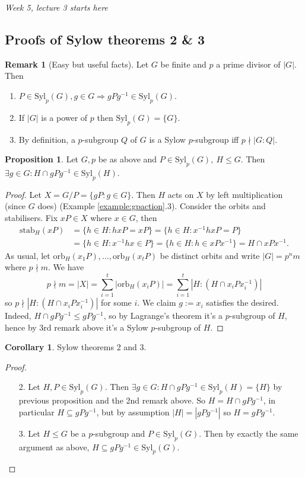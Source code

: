 \documentclass[a4paper]{article}
\newcommand{\Syl}{\text{Syl}}
\newcommand{\orb}{\text{orb}}
\newcommand{\stab}{\text{stab}}
\theoremstyle{definition}
\newtheorem{prop}[defn]{Proposition}
\newtheorem{coro}[defn]{Corollary}
\newtheorem*{remark}{Remark}
\begin{document}
\begin{flushright}
\textit{Week 5, lecture 3 starts here}
\end{flushright}

\subsection{Proofs of Sylow theorems 2 \& 3}
\begin{remark}[Easy but useful facts]
Let $G$ be finite and $p$ a prime divisor of $|G|$. Then
\begin{enumerate}
\item $P\in\Syl_p(G),g\in G\Rightarrow gPg^{-1}\in\Syl_p(G)$.
\item If $|G|$ is a power of $p$ then $\Syl_p(G)=\{G\}$.
\item By definition, a $p$-subgroup $Q$ of $G$ is a Sylow $p$-subgroup iff $p\nmid |G:Q|$.
\end{enumerate}
\end{remark}

\begin{prop}
Let $G,p$ be as above and $P\in\Syl_p(G),\ H\leq G$. Then $\exists g\in G:H\cap gPg^{-1}\in\Syl_p(H)$.
\end{prop}
\begin{proof}
Let $X=G/P=\{gP:g\in G\}$. Then $H$ acts on $X$ by left multiplication (since $G$ does) (Example \ref{example:gpaction}.3). Consider the orbits and stabilisers. Fix $xP\in X$ where $x\in G$, then
\[
\begin{aligned}
\stab_H(xP)&=\{h\in H:hxP=xP\}=\{h\in H:x^{-1}hxP=P\}\\
&=\{h\in H:x^{-1}hx\in P\}=\{h\in H:h\in xPx^{-1}\}=H\cap xPx^{-1}.
\end{aligned}
\]
As usual, let $\orb_H(x_1P),\ldots,\orb_H(x_tP)$ be distinct orbits and write $|G|=p^n m$ where $p\nmid m$. We have
\[
p\nmid m=|X|=\sum_{i=1}^t \left|\orb_H(x_i P)\right|=\sum_{i=1}^t \left|H:\left(H\cap x_i Px_i^{-1}\right)\right|
\]
so $p\nmid \left|H:\left(H\cap x_i Px_i^{-1}\right)\right|$ for some $i$. We claim $g:=x_i$ satisfies the desired. Indeed, $H\cap gPg^{-1} \leq gPg^{-1}$, so by Lagrange's theorem it's a $p$-subgroup of $H$, hence by 3rd remark above it's a Sylow $p$-subgroup of $H$.
\end{proof}

\begin{coro}
Sylow theorems 2 and 3.
\end{coro}
\begin{proof}
\begin{enumerate}
\item[2.] Let $H,P\in\Syl_p(G)$. Then $\exists g\in G:H\cap gPg^{-1}\in \Syl_p(H)=\{H\}$ by previous proposition and the 2nd remark above. So $H=H\cap gPg^{-1}$, in particular $H\subseteq gPg^{-1}$, but by assumption $|H|=|gPg^{-1}|$ so $H=gPg^{-1}$.
\item[3.] Let $H\leq G$ be a $p$-subgroup and $P\in\Syl_p(G)$. Then by exactly the same argument as above, $H\subseteq gPg^{-1}\in\Syl_p(G)$.
\end{enumerate}
\end{proof}
\end{document}

